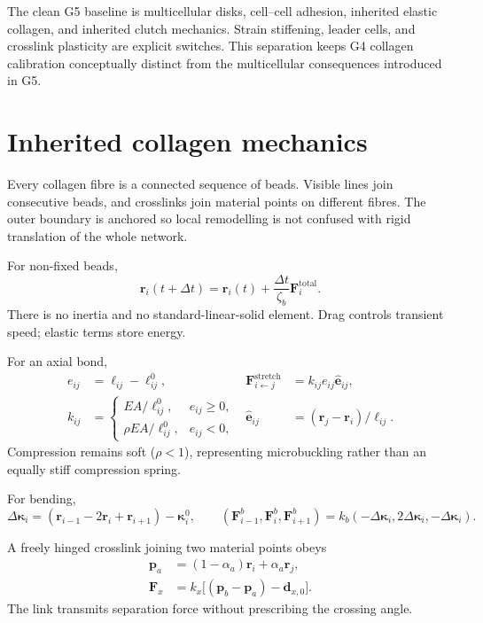\documentclass[10.5pt]{article}
\newcommand{\rv}{\mathbf r}
\newcommand{\Fv}{\mathbf F}
\newcommand{\ev}{\widehat{\mathbf e}}
\begin{document}
The clean G5 baseline is multicellular disks, cell--cell adhesion, inherited elastic collagen,
and inherited clutch mechanics. Strain stiffening, leader cells, and crosslink plasticity are
explicit switches. This separation keeps G4 collagen calibration conceptually distinct from the
multicellular consequences introduced in G5.

\section{Inherited collagen mechanics}

Every collagen fibre is a connected sequence of beads. Visible lines join consecutive beads,
and crosslinks join material points on different fibres. The outer boundary is anchored so local
remodelling is not confused with rigid translation of the whole network.

For non-fixed beads,
\begin{equation}
 \rv_i(t+\Delta t)=\rv_i(t)+\frac{\Delta t}{\zeta_b}\Fv_i^{\mathrm{total}}.
 \label{eq:euler}
\end{equation}
There is no inertia and no standard-linear-solid element. Drag controls transient speed; elastic
terms store energy.

For an axial bond,
\begin{align}
 e_{ij}&=\ell_{ij}-\ell_{ij}^0,
 &\Fv_{i\leftarrow j}^{\mathrm{stretch}}&=k_{ij}e_{ij}\ev_{ij},\\
 k_{ij}&=
 \begin{cases}
 EA/\ell_{ij}^0,&e_{ij}\ge0,\\
 \rho EA/\ell_{ij}^0,&e_{ij}<0,
 \end{cases}
 &\ev_{ij}&=(\rv_j-\rv_i)/\ell_{ij}.
 \label{eq:stretch}
\end{align}
Compression remains soft ($\rho<1$), representing microbuckling rather than an equally stiff
compression spring.

For bending,
\begin{equation}
 \Delta\boldsymbol\kappa_i=
 (\rv_{i-1}-2\rv_i+\rv_{i+1})-\boldsymbol\kappa_i^0,
 \qquad
 (\Fv_{i-1}^{b},\Fv_i^{b},\Fv_{i+1}^{b})
 =k_b(-\Delta\boldsymbol\kappa_i,2\Delta\boldsymbol\kappa_i,-\Delta\boldsymbol\kappa_i).
 \label{eq:bending}
\end{equation}

A freely hinged crosslink joining two material points obeys
\begin{align}
 \mathbf p_a&=(1-\alpha_a)\rv_i+\alpha_a\rv_j,\\
 \Fv_x&=k_x\big[(\mathbf p_b-\mathbf p_a)-\mathbf d_{x,0}\big].
 \label{eq:xlink}
\end{align}
The link transmits separation force without prescribing the crossing angle.
\end{document}

